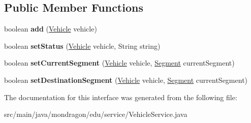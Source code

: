 \subsection*{Public Member Functions}
\begin{DoxyCompactItemize}
\item 
\mbox{\label{interfacemondragon_1_1edu_1_1service_1_1_vehicle_service_aec12bb9573790ef3f99013ad1fd70d72}} 
boolean {\bfseries add} (\mbox{\hyperlink{classmondragon_1_1edu_1_1clases_1_1_vehicle}{Vehicle}} vehicle)
\item 
\mbox{\label{interfacemondragon_1_1edu_1_1service_1_1_vehicle_service_a4942bbb4f6eb3e209c0126f0845e3442}} 
boolean {\bfseries set\+Status} (\mbox{\hyperlink{classmondragon_1_1edu_1_1clases_1_1_vehicle}{Vehicle}} vehicle, String string)
\item 
\mbox{\label{interfacemondragon_1_1edu_1_1service_1_1_vehicle_service_a69f67f848c04847969a629380353d2dd}} 
boolean {\bfseries set\+Current\+Segment} (\mbox{\hyperlink{classmondragon_1_1edu_1_1clases_1_1_vehicle}{Vehicle}} vehicle, \mbox{\hyperlink{classmondragon_1_1edu_1_1clases_1_1_segment}{Segment}} current\+Segment)
\item 
\mbox{\label{interfacemondragon_1_1edu_1_1service_1_1_vehicle_service_a73a9f68e98d78b731ff7840db41ab2ba}} 
boolean {\bfseries set\+Destination\+Segment} (\mbox{\hyperlink{classmondragon_1_1edu_1_1clases_1_1_vehicle}{Vehicle}} vehicle, \mbox{\hyperlink{classmondragon_1_1edu_1_1clases_1_1_segment}{Segment}} current\+Segment)
\end{DoxyCompactItemize}


The documentation for this interface was generated from the following file\+:\begin{DoxyCompactItemize}
\item 
src/main/java/mondragon/edu/service/Vehicle\+Service.\+java\end{DoxyCompactItemize}
